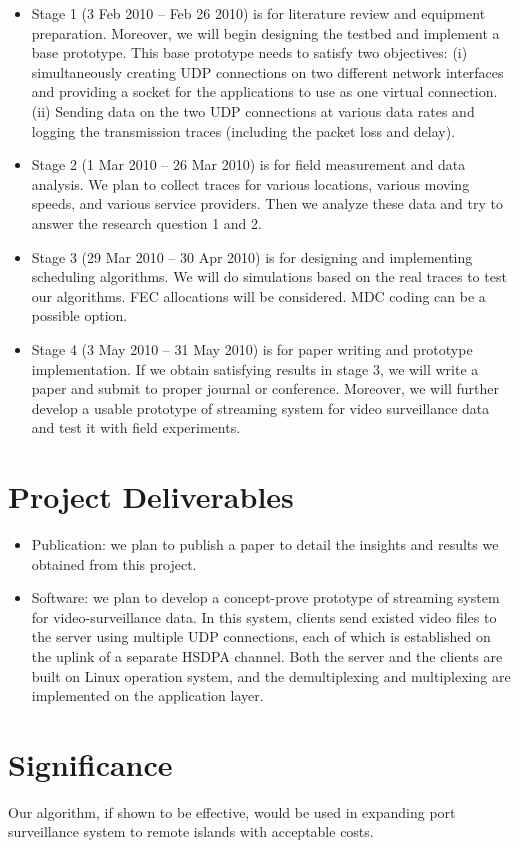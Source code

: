 \documentclass{article}
\begin{document}
    \begin{itemize}
    \item
    Stage 1 (3 Feb 2010 --  Feb 26 2010) is for literature review and equipment preparation.
    Moreover, we will begin designing the testbed and implement a base prototype. This base prototype
    needs to satisfy two objectives: (i) simultaneously creating UDP connections on two different network 
    interfaces and providing a socket for the applications to use as one virtual connection. 
    (ii) Sending data on the two UDP connections at various data rates and logging the transmission traces
    (including the packet loss and delay).

    \item
    Stage 2 (1 Mar 2010 -- 26 Mar 2010) is for field measurement and data analysis. 
    We plan to collect traces for various locations, various moving speeds, and various service providers.
    Then we analyze these data and try to answer the research question 1 and 2. 

    \item
    Stage 3 (29 Mar 2010 -- 30 Apr 2010) is for designing and implementing scheduling algorithms.
    We will do simulations based on the real traces to test our algorithms. FEC allocations will be considered.
    MDC coding can be a possible option.

    \item
    Stage 4 (3 May 2010 -- 31 May 2010) is for paper writing and prototype implementation. If we obtain satisfying results
    in stage 3, we will write a paper and submit to proper journal or conference. Moreover, we will further 
    develop a usable prototype of streaming system for video surveillance data and test it with field experiments.
    \end{itemize}
    
\section{Project Deliverables}
    \begin{itemize}
    \item
    Publication: we plan to publish a paper to detail the insights and results we obtained from this project.
    \item
    Software: we plan to develop a concept-prove prototype of streaming system for video-surveillance data.
    In this system, clients send existed video files to the server using multiple UDP connections, each of which is
    established on the uplink of a separate HSDPA channel. 
    Both the server and the clients are built on Linux operation system,
    and the demultiplexing and multiplexing are implemented on the application layer.
    \end{itemize}
\section{Significance}
    Our algorithm, if shown to be effective, would be used in expanding port surveillance system 
    to remote islands with acceptable costs.



\end{document}
